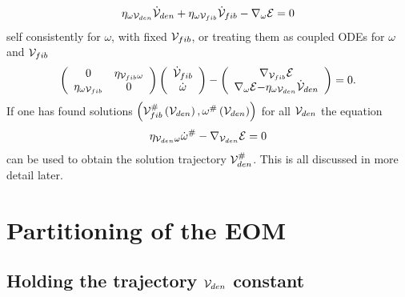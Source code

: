 \begin{equation}
\eta _{\omega {\cal V}_{den}}{\cal \dot{V}}_{den}+\eta _{\omega {\cal V}%
_{fib}}{\cal \dot{V}}_{fib}-\nabla _{\omega }{\cal E}=0  \label{omegaeq}
\end{equation}%
self consistently for $\omega $, with fixed ${\cal V}_{fib}$, or treating
them as coupled ODEs for $\omega $ and ${\cal V}_{fib}$%
\begin{equation}
\left( 
\begin{array}{cc}
0 & \eta _{{\cal V}_{fib}\omega } \\ 
\eta _{\omega {\cal V}_{fib}} & 0%
\end{array}%
\right) \left( 
\begin{array}{c}
{\cal \dot{V}}_{fib} \\ 
\dot{\omega}%
\end{array}%
\right) -\left( 
\begin{array}{c}
\nabla _{{\cal V}_{fib}}{\cal E} \\ 
\nabla _{\omega }{\cal E-}\eta _{\omega {\cal V}_{den}}{\cal \dot{V}}_{den}%
\end{array}%
\right) =0.
\end{equation}%
If one has found solutions $\left( {\cal V}_{fib}^{\#}\left( {\cal V}%
_{den}\right) ,\omega ^{\#}\left( {\cal V}_{den}\right) \right) $ for all $%
{\cal V}_{den}$ the equation 
\begin{equation}
\eta _{{\cal V}_{den}\omega }\dot{\omega}^{\#}-\nabla _{{\cal V}_{den}}{\cal %
E}=0  \label{gammaeq}
\end{equation}%
can be used to obtain the solution trajectory ${\cal V}_{den}^{\#}$. This is
all discussed in more detail later.

\section{Partitioning of the EOM}

\subsection{Holding the trajectory ${\cal V}_{den}$ constant}

